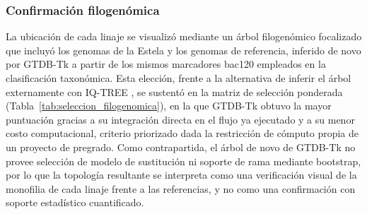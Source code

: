 \subsubsection{Confirmación filogenómica}

La ubicación de cada linaje se visualizó mediante un árbol filogenómico focalizado que incluyó los genomas de la Estela y los genomas de referencia, inferido de novo por GTDB-Tk \cite{gtdbtk2019} a partir de los mismos marcadores bac120 empleados en la clasificación taxonómica. Esta elección, frente a la alternativa de inferir el árbol externamente con IQ-TREE \cite{minh2020}, se sustentó en la matriz de selección ponderada (Tabla~\ref{tab:seleccion_filogenomica}), en la que GTDB-Tk obtuvo la mayor puntuación gracias a su integración directa en el flujo ya ejecutado y a su menor costo computacional, criterio priorizado dada la restricción de cómputo propia de un proyecto de pregrado. Como contrapartida, el árbol de novo de GTDB-Tk no provee selección de modelo de sustitución ni soporte de rama mediante bootstrap, por lo que la topología resultante se interpreta como una verificación visual de la monofilia de cada linaje frente a las referencias, y no como una confirmación con soporte estadístico cuantificado.

\begin{table}[H]
\centering

\caption{Matriz de selección de software para la confirmación filogenómica.}
\label{tab:seleccion_filogenomica}

\end{table}

